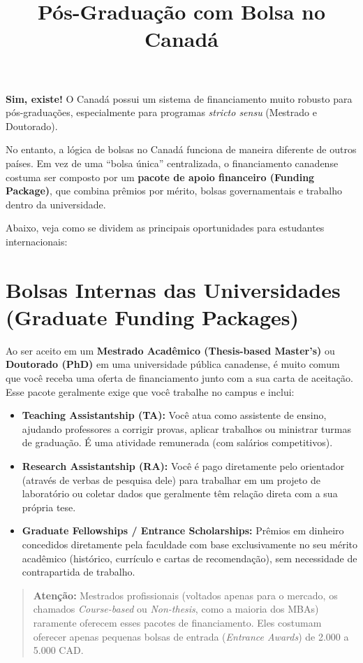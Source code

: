 \documentclass[12pt,a4paper]{article}
\title{\textbf{Pós-Graduação com Bolsa no Canadá}}
\author{}
\date{}
\begin{document}
\maketitle

\textbf{Sim, existe!} O Canadá possui um sistema de financiamento muito robusto para pós-graduações, especialmente para programas \textit{stricto sensu} (Mestrado e Doutorado). 

No entanto, a lógica de bolsas no Canadá funciona de maneira diferente de outros países. Em vez de uma ``bolsa única'' centralizada, o financiamento canadense costuma ser composto por um \textbf{pacote de apoio financeiro (Funding Package)}, que combina prêmios por mérito, bolsas governamentais e trabalho dentro da universidade.

Abaixo, veja como se dividem as principais oportunidades para estudantes internacionais:

\section{Bolsas Internas das Universidades (Graduate Funding Packages)}
Ao ser aceito em um \textbf{Mestrado Acadêmico (Thesis-based Master's)} ou \textbf{Doutorado (PhD)} em uma universidade pública canadense, é muito comum que você receba uma oferta de financiamento junto com a sua carta de aceitação. Esse pacote geralmente exige que você trabalhe no campus e inclui:

\begin{itemize}[leftmargin=*]
    \item \textbf{Teaching Assistantship (TA):} Você atua como assistente de ensino, ajudando professores a corrigir provas, aplicar trabalhos ou ministrar turmas de graduação. É uma atividade remunerada (com salários competitivos).
    \item \textbf{Research Assistantship (RA):} Você é pago diretamente pelo orientador (através de verbas de pesquisa dele) para trabalhar em um projeto de laboratório ou coletar dados que geralmente têm relação direta com a sua própria tese.
    \item \textbf{Graduate Fellowships / Entrance Scholarships:} Prêmios em dinheiro concedidos diretamente pela faculdade com base exclusivamente no seu mérito acadêmico (histórico, currículo e cartas de recomendação), sem necessidade de contrapartida de trabalho.
\end{itemize}

\begin{quote}
    \textbf{Atenção:} Mestrados profissionais (voltados apenas para o mercado, os chamados \textit{Course-based} ou \textit{Non-thesis}, como a maioria dos MBAs) raramente oferecem esses pacotes de financiamento. Eles costumam oferecer apenas pequenas bolsas de entrada (\textit{Entrance Awards}) de 2.000 a 5.000 CAD.
\end{quote}
\end{document}
